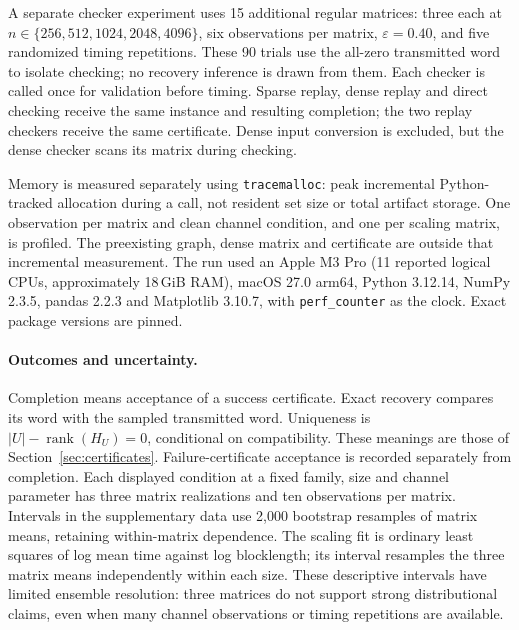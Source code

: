 A separate checker experiment uses 15 additional regular matrices:
three each at $n\in\{256,512,1024,2048,4096\}$, six observations per
matrix, $\varepsilon=0.40$, and five randomized timing repetitions.
These 90 trials use the all-zero transmitted word to isolate checking;
no recovery inference is drawn from them. Each checker is called once
for validation before timing. Sparse replay, dense replay and direct
checking receive the same instance and resulting completion; the two
replay checkers receive the same certificate. Dense input conversion
is excluded, but the dense checker scans its matrix during checking.

Memory is measured separately using \texttt{tracemalloc}: peak
incremental Python-tracked allocation during a call, not resident set
size or total artifact storage. One observation per matrix and clean
channel condition, and one per scaling matrix, is profiled. The
preexisting graph, dense matrix and certificate are outside that
incremental measurement. The run used an Apple M3 Pro (11 reported
logical CPUs, approximately 18\,GiB RAM), macOS 27.0 arm64, Python
3.12.14, NumPy 2.3.5, pandas 2.2.3 and Matplotlib 3.10.7, with
\texttt{perf\_counter} as the clock. Exact package versions are pinned.

\paragraph{Outcomes and uncertainty.}
Completion means acceptance of a success certificate. Exact recovery
compares its word with the sampled transmitted word. Uniqueness is
$|U|-\operatorname{rank}(H_U)=0$, conditional on compatibility.
These meanings are those of Section~\ref{sec:certificates}.
Failure-certificate acceptance is recorded separately from completion.
Each displayed condition at a fixed family, size and channel parameter
has three matrix realizations and ten observations per matrix.
Intervals in the supplementary data use 2,000 bootstrap resamples of
matrix means, retaining within-matrix dependence. The scaling fit is
ordinary least squares of log mean time against log blocklength;
its interval resamples the three matrix means independently within each
size. These descriptive intervals have limited ensemble resolution:
three matrices do not support strong distributional claims, even when
many channel observations or timing repetitions are available.

